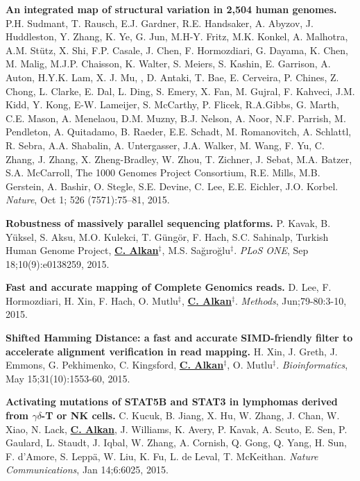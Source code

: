   \vspace{-.2cm}        
  {\bf An integrated map of structural variation in 2,504 human genomes.}
  P.H. Sudmant, T. Rausch, E.J. Gardner,  R.E. Handsaker, A. Abyzov, J. Huddleston, Y. Zhang, K. Ye, G. Jun, M.H-Y. Fritz, M.K. Konkel, A. Malhotra, A.M. Stütz, X. Shi, F.P. Casale, J. Chen, 
  F. Hormozdiari, G. Dayama, K. Chen, M. Malig, M.J.P. Chaisson, K. Walter, S. Meiers, S. Kashin, E. Garrison, A. Auton, H.Y.K. Lam, X. J. Mu, \calkan, D. Antaki, T. Bae, E. Cerveira, P. Chines, Z. Chong, 
  L. Clarke, E. Dal, L. Ding, S. Emery, X. Fan, M. Gujral, F. Kahveci, J.M. Kidd, Y. Kong, E-W. Lameijer, S. McCarthy, P. Flicek, R.A.Gibbs, G. Marth, C.E. Mason, A. Menelaou, D.M. Muzny, 
  B.J. Nelson, A. Noor, N.F. Parrish, M. Pendleton, A. Quitadamo, B. Raeder, E.E. Schadt, M. Romanovitch, A. Schlattl, R. Sebra, A.A. Shabalin, A. Untergasser, 
  J.A. Walker, M. Wang, F. Yu, C. Zhang, J. Zhang, X. Zheng-Bradley, W. Zhou, T. Zichner, J. Sebat, M.A. Batzer, S.A. McCarroll, 
  The 1000 Genomes Project Consortium, R.E. Mills, M.B. Gerstein, A. Bashir, O. Stegle, S.E. Devine, C. Lee, E.E. Eichler, J.O. Korbel. 
  {\em Nature}, Oct 1; 526 (7571):75–81, 2015.



  \vspace{-.2cm}        
  {\bf Robustness of massively parallel sequencing platforms.}
  P. Kavak, B. Yüksel, S. Aksu, M.O. Kulekci, T. Güngör, F. Hach, S.C. Sahinalp, Turkish Human Genome Project, {\bf {\underline {C. Alkan}}}$^\ddag$,
  M.S. Sağıroğlu$^\ddag$.    
  {\em PLoS ONE},  Sep 18;10(9):e0138259, 2015.  

  \vspace{-.2cm}        
  {\bf Fast and accurate mapping of Complete Genomics reads.}
  D. Lee, F. Hormozdiari, H. Xin, F. Hach, O. Mutlu$^\ddag$,  {\bf {\underline {C. Alkan}}}$^\ddag$.
  {\em Methods}, Jun;79-80:3-10, 2015. 

  \vspace{-.2cm}        
  {\bf Shifted Hamming Distance: a fast and accurate SIMD-friendly filter to accelerate alignment verification in read mapping.} H. Xin, J. Greth, J. Emmons, 
G. Pekhimenko, C. Kingsford, {\bf {\underline{C. Alkan}}}$^\ddag$,  O. Mutlu$^\ddag$. {\em Bioinformatics},  May 15;31(10):1553-60, 2015.


   \clearpage
  \vspace{-.2cm}        
  {\bf Activating mutations of STAT5B and STAT3 in lymphomas derived from $\gamma\delta$-T or NK cells.}
   C. Kucuk, B. Jiang, X. Hu, W. Zhang, J. Chan, W. Xiao, N. Lack,   {\bf {\underline {C. Alkan}}},  J. Williams, K. Avery, P. Kavak, A. Scuto, E. Sen,  P. Gaulard, L. Staudt, J. Iqbal,  W. Zhang,  A. Cornish, Q. Gong, Q.  Yang, H. Sun, F. d'Amore, S. Leppä, W. Liu, K. Fu, L. de Leval, T. McKeithan.
 {\em Nature Communications}, Jan 14;6:6025, 2015.



